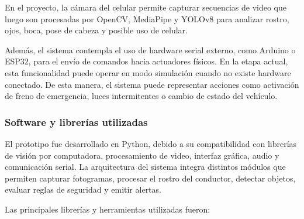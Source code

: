 \documentclass[conference]{IEEEtran}
\begin{document}
\begin{table}[H]
\centering
\caption{Características de la cámara del celular utilizado}
\label{tab:caracteristicas_celular}
\end{table}

En el proyecto, la cámara del celular permite capturar secuencias de video que luego son procesadas por OpenCV, MediaPipe y YOLOv8 para analizar rostro, ojos, boca, pose de cabeza y posible uso de celular.

Además, el sistema contempla el uso de hardware serial externo, como Arduino o ESP32, para el envío de comandos hacia actuadores físicos. En la etapa actual, esta funcionalidad puede operar en modo simulación cuando no existe hardware conectado. De esta manera, el sistema puede representar acciones como activación de freno de emergencia, luces intermitentes o cambio de estado del vehículo.

\subsubsection{Software y librerías utilizadas}

El prototipo fue desarrollado en Python, debido a su compatibilidad con librerías de visión por computadora, procesamiento de video, interfaz gráfica, audio y comunicación serial. La arquitectura del sistema integra distintos módulos que permiten capturar fotogramas, procesar el rostro del conductor, detectar objetos, evaluar reglas de seguridad y emitir alertas.

Las principales librerías y herramientas utilizadas fueron:
\end{document}
